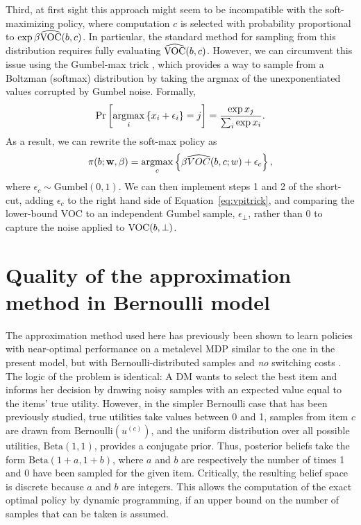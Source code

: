 Third, at first sight this approach might seem to be incompatible with the soft-maximizing policy, where computation $c$ is selected with probability proportional to $\exp\beta\widehat{\text{VOC}}(b,c)$. In particular, the standard method for sampling from this distribution requires fully evaluating $\widehat{\text{VOC}}(b,c)$. However, we can circumvent this issue using the Gumbel-max trick \citep{yellott1977relationship}, which provides a way to sample from a Boltzman (softmax) distribution by taking the argmax of the unexponentiated values corrupted by Gumbel noise. Formally,
%
\begin{equation}
  \Pr\left[\operatorname*{argmax}_{i}\left\{ x_{i}+\epsilon_{i}\right\} =j\right]=\frac{\exp x_{j}}{\sum_{i}\exp x_{i}}.
\end{equation}
%
As a result, we can rewrite the soft-max policy as 
%
\begin{equation}
  \pi(b;\mathbf{w},\beta)=\operatorname*{argmax}_{c}\left\{ \beta\widehat{VOC}(b,c;w)+\epsilon_{c}\right\} ,
\end{equation}
%
where $\epsilon_{c}\sim\text{Gumbel}(0,1)$. We can then implement steps 1 and 2 of the short-cut, adding $\epsilon_{c}$ to the right hand side of Equation~\ref{eq:vpitrick}, and comparing the lower-bound VOC to an independent Gumbel sample, $\epsilon_\bot$, rather than 0 to capture the noise applied to $\text{VOC}(b,\bot)$.



\section{Quality of the approximation method in Bernoulli model}\label{app:attention-bernoulli}

The approximation method used here has previously been shown to learn policies with near-optimal performance on a metalevel MDP similar to the one in the present model, but with Bernoulli-distributed samples and \emph{no} switching costs \citep{callaway2018learning}. The logic of the problem is identical: A DM wants to select the best item and informs her decision by drawing noisy samples with an expected value  equal to the items' true utility. However, in the simpler Bernoulli case that has been previously studied, true utilities take values between 0 and 1, samples from item $c$ are drawn from $\text{Bernoulli}(u^{(c)})$,  and the  uniform distribution over all possible utilities, $\text{Beta}(1, 1)$, provides a conjugate prior. Thus, posterior beliefs take the form $\text{Beta}(1+a, 1+b)$, where $a$ and $b$ are respectively the number of times 1 and 0 have been sampled for the given item.  Critically, the resulting belief space is discrete because $a$ and $b$ are integers. This allows the computation of the exact optimal policy by dynamic programming, if an upper bound on the number of samples that can be taken is assumed. 

